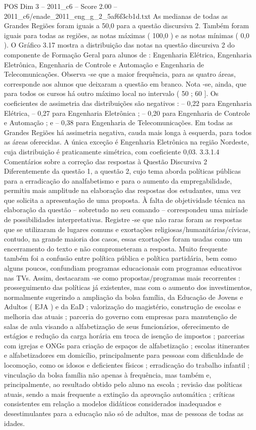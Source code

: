 \begin{textsample}{POS Dim 3 – 2011\_c6 – Score 2.00 – 2011\_c6/enade\_2011\_eng\_g\_2\_5af6f3cb1d.txt}
As medianas de todas as Grandes Regiões foram iguais a 50,0 para a questão discursiva 2.
Também foram iguais para todas as regiões, as notas máximas ( 100,0 ) e as notas mínimas ( 0,0 ).
O Gráfico 3.17 mostra a distribuição das notas na questão discursiva 2 do componente de Formação Geral para alunos de : Engenharia Elétrica, Engenharia Eletrônica, Engenharia de Controle e Automação e Engenharia de Telecomunicações.
Observa -se que a maior frequência, para as quatro áreas, corresponde aos alunos que deixaram a questão em branco.
Nota -se, ainda, que para todos os cursos há outro máximo local no intervalo ( 50 ; 60 ].
Os coeficientes de assimetria das distribuições são negativos : – 0,22 para Engenharia Elétrica, – 0,27 para Engenharia Eletrônica ; – 0,20 para Engenharia de Controle e Automação ; e – 0,38 para Engenharia de Telecomunicações.
Em todas as Grandes Regiões há assimetria negativa, cauda mais longa à esquerda, para todos as áreas oferecidas.
A única exceção é Engenharia Eletrônica na região Nordeste, cuja distribuição é praticamente simétrica, com coeficiente 0,03. 3.3.1.4 Comentários sobre a correção das respostas à Questão Discursiva 2 Diferentemente da questão 1, a questão 2, cujo tema aborda políticas públicas para a erradicação do analfabetismo e para o aumento da empregabilidade, permitiu mais amplitude na elaboração das respostas dos estudantes, uma vez que solicita a apresentação de uma proposta.
À falta de objetividade técnica na elaboração da questão – sobretudo no seu comando – correspondeu uma miríade de possibilidades interpretativas.
Registre -se que não raras foram as respostas que se utilizaram de lugares comuns e exortações religiosas/humanitárias/cívicas, contudo, na grande maioria dos casos, essas exortações foram usadas como um encerramento do texto e não comprometeram a resposta.
Muito frequente também foi a confusão entre política pública e política partidária, bem como alguns poucos, confundiam programas educacionais com programas educativos nas TVs.
Assim, destacaram -se como propostas/programas mais recorrentes : prosseguimento das políticas já existentes, mas com o aumento dos investimentos, normalmente sugerindo a ampliação da bolsa família, da Educação de Jovens e Adultos ( EJA ) e da EaD ; valorização do magistério, construção de escolas e melhoria das atuais ; parceria do governo com empresas para manutenção de salas de aula visando a alfabetização de seus funcionários, oferecimento de estágios e redução da carga horária em troca de isenção de impostos ; parcerias com igrejas e ONGs para criação de espaços de alfabetização ; escolas itinerantes e alfabetizadores em domicílio, principalmente para pessoas com dificuldade de locomoção, como os idosos e deficientes físicos ; erradicação do trabalho infantil ; vinculação da bolsa família não apenas à frequência, mas também e, principalmente, ao resultado obtido pelo aluno na escola ; revisão das políticas atuais, sendo a mais frequente a extinção da aprovação automática ; críticas consistentes em relação a modelos didáticos considerados inadequados e desestimulantes para a educação não só de adultos, mas de pessoas de todas as idades.

\end{textsample}
